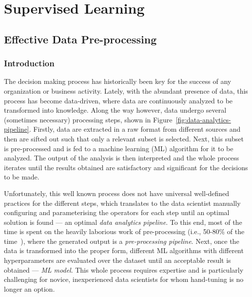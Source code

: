 \chapter{Supervised Learning}
\label{automl-chap:supervised}

\section{Effective Data Pre-processing}

\subsection{Introduction}

The decision making process has historically been key for the success of any organization or business activity.
Lately, with the abundant presence of data, this process has become data-driven,
where data are continuously analyzed to be transformed into knowledge.
Along the way however, data undergo several (sometimes necessary) processing steps, shown in Figure~\ref{fig:data-analytics-pipeline}. Firstly, data are extracted in a raw format from different sources and then are sifted out such that only a relevant subset is selected. Next, this subset is pre-processed and is fed to a machine learning (ML) algorithm for it to be analyzed. The output of the analysis is then interpreted and the whole process iterates until the results obtained are satisfactory and significant for the decisions to be made. 

Unfortunately, this well known process does not have universal well-defined practices for the different steps, which translates to the data scientist manually configuring and parameterising the operators for each step until an optimal solution is found --- an optimal \textit{data analytics pipeline}. To this end, most of the time is spent on the heavily laborious work of pre-processing (i.e., 50-80\% of the time~\cite{Munson09Pre}), where the generated output is a \textit{pre-processing pipeline}. Next, once the data is transformed into the proper form, different ML algorithms with different hyperparameters are evaluated over the dataset until an acceptable result is obtained --- \textit{ML model}. This whole process requires expertise and is particularly challenging for novice, inexperienced data scientists for whom hand-tuning is no longer an option.

